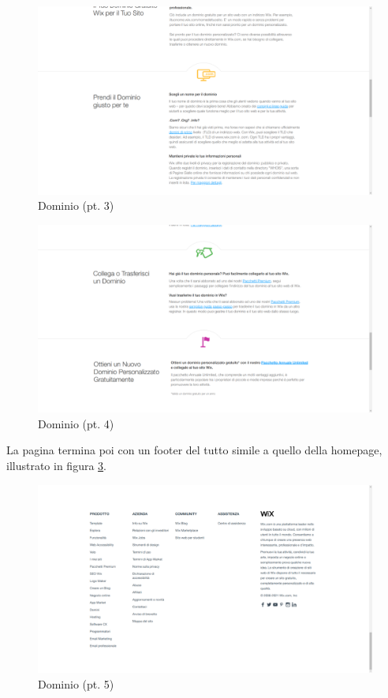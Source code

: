 \documentclass[11pt,a4paper]{article}
\begin{document}
\begin{figure}[H]
  \centering
  \includegraphics[width=1\textwidth]{img/domain-03.png}
  \caption{Dominio (pt. 3)}
  \label{fig:domain-03}
\end{figure}

\begin{figure}[H]
  \centering
  \includegraphics[width=1\textwidth]{img/domain-04.png}
  \caption{Dominio (pt. 4)}
  \label{fig:domain-04}
\end{figure}

La pagina termina poi con un footer del tutto simile a quello della
homepage, illustrato in figura \ref{fig:domain-05}.

\begin{figure}[H]
  \centering
  \includegraphics[width=1\textwidth]{img/domain-05.png}
  \caption{Dominio (pt. 5)}
  \label{fig:domain-05}
\end{figure}
\end{document}
